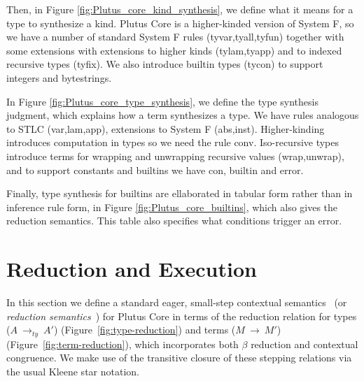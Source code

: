 \documentclass[a4paper]{article}
\newcommand{\typeStep}[2]{#1 ~ \rightarrow_{ty} ~ #2}
\newcommand{\step}[2]{#1 ~ \rightarrow ~ #2}
\begin{document}

Then, in Figure \ref{fig:Plutus_core_kind_synthesis}, we define what
it means for a type to synthesize a kind. Plutus Core is a
higher-kinded version of System F, so we have a number of standard
System F rules (tyvar,tyall,tyfun) together with some extensions with
extensions to higher kinds (tylam,tyapp) and to indexed
recursive types (tyfix). We also introduce builtin types (tycon) to
support integers and bytestrings.

In Figure \ref{fig:Plutus_core_type_synthesis}, we define the type
synthesis judgment, which explains how a term synthesizes a type. We
have rules analogous to STLC (var,lam,app), extensions to System F
(abs,inst). Higher-kinding introduces computation in types so we need
the rule conv. Iso-recursive types introduce terms for wrapping and
unwrapping recursive values (wrap,unwrap), and to support constants
and builtins we have con, builtin and error.

Finally, type synthesis for builtins are ellaborated in tabular form
rather than in inference rule form, in Figure
\ref{fig:Plutus_core_builtins}, which also gives the reduction
semantics. This table also specifies what conditions trigger an error.








\section{Reduction and Execution}
\label{sec:reduction}

In this section we define a standard eager,
small-step contextual semantics~\cite[5.3]{Harper:PFPL} (or
\textit{reduction semantics}~\cite[\S2]{Felleisen-Hieb}) for Plutus
Core in terms of the reduction relation for types
(\(\typeStep{A}{A'}\)) (Figure~\ref{fig:type-reduction}) 
and terms (\(\step{M}{M'}\)) (Figure~\ref{fig:term-reduction}), which
incorporates both $\beta$ reduction and contextual congruence. We make
use of the transitive closure of these stepping relations via the
usual Kleene star notation.
\end{document}
